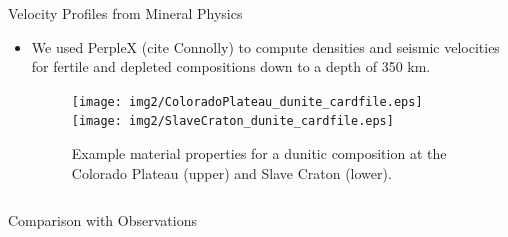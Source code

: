 \documentclass[final]{beamer}
\newlength{\onecolwid}
\newlength{\twocolwid}
\begin{document}
\begin{frame}[t]
\begin{columns}[t]
\begin{column}{\twocolwid}
\begin{columns}[t,totalwidth=\twocolwid]
\begin{column}{\onecolwid}
\begin{block}{Velocity Profiles from Mineral Physics}

\begin{itemize}

\item We used PerpleX (cite Connolly) to compute densities and seismic velocities for fertile and depleted compositions down to a depth of 350 km.

\begin{figure}
\texttt{[image: img2/ColoradoPlateau\_dunite\_cardfile.eps]} \\
\texttt{[image: img2/SlaveCraton\_dunite\_cardfile.eps]} \\
\caption{Example material properties for a dunitic composition at the Colorado Plateau (upper) and Slave Craton (lower).}
\end{figure}




\end{itemize}

\end{block}


\end{column} %

\end{columns} %


\begin{columns}[t,totalwidth=\twocolwid] %

\begin{column}{\onecolwid} %


\begin{alertblock}{Comparison with Observations}


\end{alertblock}
\end{column}
\end{columns}
\end{column}
\end{columns}
\end{frame}
\end{document}

